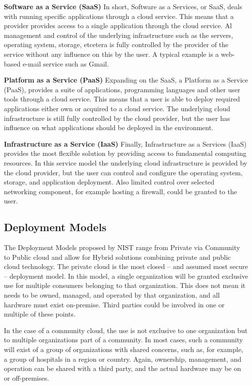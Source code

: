 \textbf{Software as a Service (SaaS)}
In short, Software as a Services, or SaaS, deals with running specific applications through a cloud service. This means that a provider provides access to a single application through the cloud service. Al management and control of the underlying infrastructure such as the servers, operating system, storage, etcetera is fully controlled by the provider of the service without any influence on this by the user. A typical example is a web-based e-mail service such as Gmail.

\textbf{Platform as a Service (PaaS)}
Expanding on the SaaS, a Platform as a Service (PaaS), provides a suite of applications, programming languages and other user tools through a cloud service. This means that a user is able to deploy required applications either own or acquired to a cloud service. The underlying cloud infrastructure is still fully controlled by the cloud provider, but the user has influence on what applications should be deployed in the environment.

\textbf{Infrastructure as a Service (IaaS)}
Finally, Infrastructure as a Services (IaaS) provides the most flexible solution by providing access to fundamental computing resources. In this service model the underlying cloud infrastructure is provided by the cloud provider, but the user can control and configure the operating system, storage, and application deployment. Also limited control over selected networking component, for example hosting a firewall, could be granted to the user.

\subsection{Deployment Models}
The Deployment Models proposed by NIST range from Private via Community to Public cloud and allow for Hybrid solutions combining private and public cloud technology. 
The private cloud is the most closed – and assumed most secure – deployment model. In this model, a single organization will be granted exclusive use for multiple consumers belonging to that organization. This does not mean it needs to be owned, managed, and operated by that organization, and all hardware must exist on-premise. Third parties could be involved in one or multiple of these points. 

In the case of a community cloud, the use is not exclusive to one organization but to multiple organizations part of a community. In most cases, such a community will exist of a group of organizations with shared concerns, such as, for example, a group of hospitals in a region or country. Again, ownership, management, and operation can be shared with a third party, and the actual hardware may be on or off-premises.

